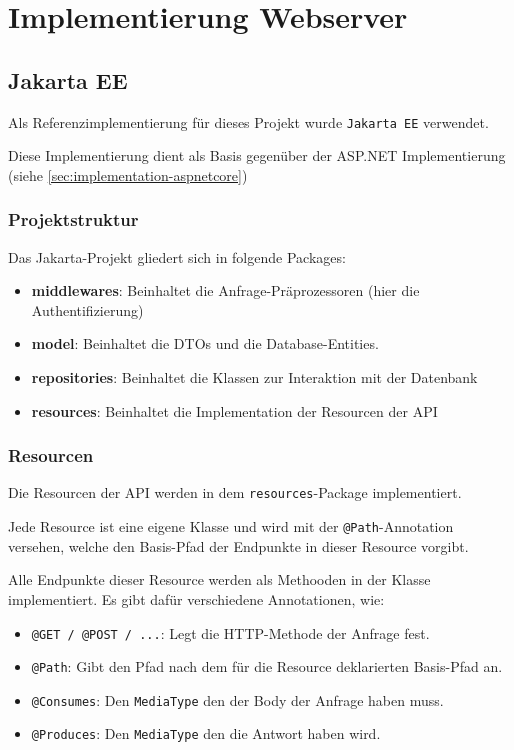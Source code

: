 \chapter{Implementierung Webserver}

\section{Jakarta EE}
\label{sec:implementation-jakarta}

Als Referenzimplementierung für dieses Projekt wurde \texttt{Jakarta EE} verwendet.

Diese Implementierung dient als Basis gegenüber der ASP.NET Implementierung (siehe \ref{sec:implementation-aspnetcore})

\subsection{Projektstruktur}

Das Jakarta-Projekt gliedert sich in folgende Packages:
\begin{itemize}
    \item \textbf{middlewares}: Beinhaltet die Anfrage-Präprozessoren (hier die Authentifizierung)
    \item \textbf{model}: Beinhaltet die \ac{DTO}s und die Database-Entities.
    \item \textbf{repositories}: Beinhaltet die Klassen zur Interaktion mit der Datenbank
    \item \textbf{resources}: Beinhaltet die Implementation der Resourcen der API
\end{itemize}

\subsection{Resourcen}

Die Resourcen der API werden in dem \texttt{resources}-Package implementiert.

Jede Resource ist eine eigene Klasse und wird mit der \texttt{@Path}-Annotation versehen, welche den Basis-Pfad der Endpunkte in dieser Resource vorgibt.

Alle Endpunkte dieser Resource werden als Methooden in der Klasse implementiert.
Es gibt dafür verschiedene Annotationen, wie:

\begin{itemize}
    \item \texttt{@GET / @POST / ...}: Legt die HTTP-Methode der Anfrage fest.
    \item \texttt{@Path}: Gibt den Pfad nach dem für die Resource deklarierten Basis-Pfad an.
    \item \texttt{@Consumes}: Den \texttt{MediaType} den der Body der Anfrage haben muss.
    \item \texttt{@Produces}: Den \texttt{MediaType} den die Antwort haben wird.
\end{itemize}

